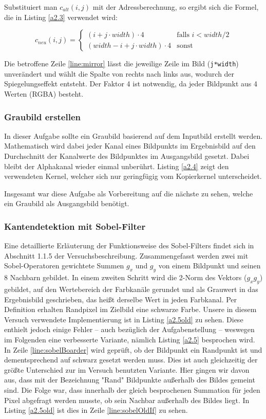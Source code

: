 \documentclass[12pt,a4paper]{scrartcl}
\begin{document}
Substituiert man $c_{alt}(i,j)$ mit der Adressberechnung, so ergibt sich die Formel, die in Listing \ref{a2.3} verwendet wird:

\begin{equation} \label{eq:mirror}
    c_{neu}(i,j) =
        \begin{cases}
            (i + j \cdot width) \cdot 4 & \text{falls } i < width/2\\
            (width-i + j \cdot width) \cdot 4 & \text{sonst }
        \end{cases}
\end{equation}

Die betroffene Zeile \ref{line:mirror} l\"asst die jeweilige Zeile im Bild (\texttt{j*width}) unver\"andert und w\"ahlt die Spalte von rechts nach links aus, wodurch der Spiegelungseffekt entsteht.
Der Faktor 4 ist notwendig, da jeder Bildpunkt aus 4 Werten (RGBA) besteht.

\subsubsection{Graubild erstellen}
In dieser Aufgabe sollte ein Graubild basierend auf dem Inputbild erstellt werden.
Mathematisch wird dabei jeder Kanal eines Bildpunkts im Ergebnisbild auf den Durchschnitt der Kanalwerte des Bildpunktes im Ausgangsbild gesetzt.
Dabei bleibt der Alphakanal wieder einmal unber\"uhrt.
Listing \ref{a2.4} zeigt den verwendeten Kernel, welcher sich nur geringf\"ugig vom Kopierkernel unterscheidet. 

Insgesamt war diese Aufgabe als Vorbereitung auf die n\"achste zu sehen, welche ein Graubild als Ausgangsbild ben\"otigt.

\subsubsection{Kantendetektion mit Sobel-Filter}
Eine detaillierte Erl\"auterung der Funktionsweise des Sobel-Filters findet sich in Abschnitt 1.1.5 der Versuchsbeschreibung.
Zusammengefasst werden zwei mit Sobel-Operatoren gewichtete Summen $g_x$ und $g_y$ von einem Bildpunkt und seinen 8 Nachbarn gebildet.
In einem zweiten Schritt wird die 2-Norm des Vektors ($g_x g_y$) gebildet, auf den Wertebereich der Farbkan\"ale gerundet und als Grauwert in das Ergebnisbild geschrieben, das hei\ss t derselbe Wert in jeden Farbkanal.
Per Definition erhalten Randpixel im Zielbild eine schwarze Farbe.
Unsere in diesem Versuch verwendete Implementierung ist in Listing \ref{a2.5old} zu sehen.
Diese enthielt jedoch einige Fehler -- auch bez\"uglich der Aufgabenstellung -- weswegen im Folgenden eine verbesserte Variante, n\"amlich Listing \ref{a2.5}  besprochen wird.
In Zeile \ref{line:sobelBoarder} wird gepr\"uft, ob der Bildpunkt ein Randpunkt ist und dementsprechend auf schwarz gesetzt werden muss.
Dies ist auch gleichzeitig der gr\"o\ss{}te Unterschied zur im Versuch benutzten Variante.
Hier gingen wir davon aus, dass mit der Bezeichnung "Rand" Bildpunkte au\ss{}erhalb des Bildes gemeint sind.
Die Folge war, dass innerhalb der gleich besprochenen Summation f\"ur jeden Pixel abgefragt werden musste, ob sein Nachbar au\ss{}erhalb des Bildes liegt.
In Listing \ref{a2.5old} ist dies in Zeile \ref{line:sobelOldIf} zu sehen.
\end{document}
